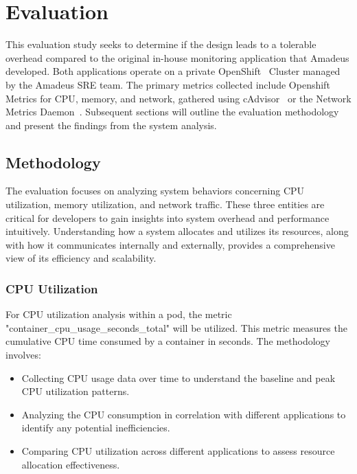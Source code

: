 
\chapter{Evaluation}\label{chapter:evaluation}

This evaluation study seeks to determine if the design leads to a tolerable overhead compared to the original in-house monitoring application that Amadeus developed. Both applications operate on a private OpenShift~\parencite{RedHatOpenShift} Cluster managed by the Amadeus \ac{SRE} team. The primary metrics collected include Openshift Metrics for \ac{CPU}, memory, and network, gathered using cAdvisor~\parencite{GoogleCadvisor2024} or the Network Metrics Daemon~\parencite{OpenshiftNetworkmetricsdaemon2023}. Subsequent sections will outline the evaluation methodology and present the findings from the system analysis. 

\section{Methodology}

The evaluation focuses on analyzing system behaviors concerning \ac{CPU} utilization, memory utilization, and network traffic. These three entities are critical for developers to gain insights into system overhead and performance intuitively. Understanding how a system allocates and utilizes its resources, along with how it communicates internally and externally, provides a comprehensive view of its efficiency and scalability.

\subsection{CPU Utilization}

For \ac{CPU} utilization analysis within a pod, the metric "container\_cpu\_usage\_seconds\_total" will be utilized. This metric measures the cumulative \ac{CPU} time consumed by a container in seconds. The methodology involves:

\begin{itemize}
    \item Collecting \ac{CPU} usage data over time to understand the baseline and peak \ac{CPU} utilization patterns.
    \item Analyzing the \ac{CPU} consumption in correlation with different applications to identify any potential inefficiencies.
    \item Comparing \ac{CPU} utilization across different applications to assess resource allocation effectiveness.
\end{itemize}

